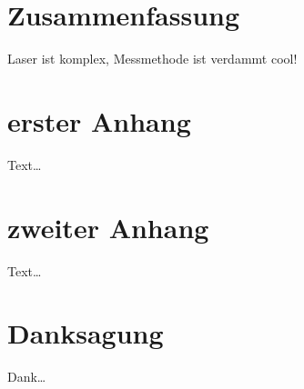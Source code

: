 \documentclass[bachelor,       %
               twoside,        %
               BCOR10mm,       %
               english,ngerman, %
               ]{GAUBM}
\begin{document}
\chapter{Zusammenfassung}
Laser ist komplex, Messmethode ist verdammt cool!

\appendix
\chapter{erster Anhang}
Text\dots
\chapter{zweiter Anhang}
Text\dots

\cleardoublepage
 

\chapter*{Danksagung}
Dank\dots

\Declaration
\end{document}
